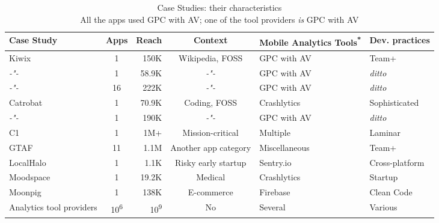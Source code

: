 \begin{table}
    \centering
    \tabcolsep=0.06cm
    \footnotesize
    \begin{tabular}{lcrcll}\toprule
    Case Study               & Apps                 & Reach & Context & Mobile Analytics Tools\textsuperscript{*}  &Dev. practices  \\
    \midrule
    Kiwix                    &                    1 &  150K & Wikipedia, FOSS            & GPC with AV &          Team+ \\ 
     \textit{-"-}            &                    1 & 58.9K & \textit{-"-}   & GPC with AV & \textit{ditto} \\
     \textit{-"-}            &                   16 &  222K & \textit{-"-}   & GPC with AV & \textit{ditto} \\
    Catrobat                 &                    1 & 70.9K & Coding, FOSS            & Crashlytics &  Sophisticated \\
     \textit{-"-}            &                    1 &  190K & \textit{-"-}   & GPC with AV & \textit{ditto} \\
    C1                       &                    1 &  1M+  & Mission-critical &    Multiple &        Laminar \\
    GTAF                     &                   11 &  1.1M & Another app category             &Miscellaneous &          Team+ \\
    LocalHalo                &                    1 &  1.1K & Risky early startup &   Sentry.io & Cross-platform \\
    Moodspace                &                    1 & 19.2K & Medical    & Crashlytics &        Startup \\
    Moonpig                  &                    1 & 138K  & E-commerce &    Firebase &     Clean Code \\
    Analytics tool providers &10\textsuperscript{6} &10\textsuperscript{9} & No &  Several &        Various \\
    \bottomrule
    \end{tabular}
    \caption[Case Studies: their characteristics]{Case Studies: their characteristics \\ {\tiny * All the apps used GPC with AV; one of the tool providers \emph{is} GPC with AV}}
    \label{tab:empirical-studies-their-characteristics}
\end{table}

